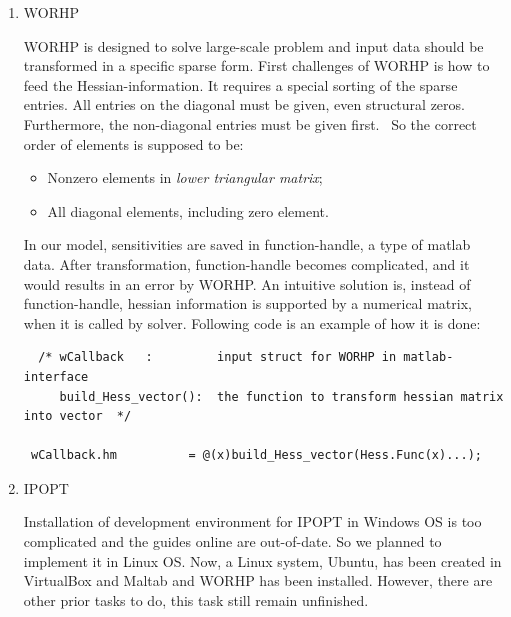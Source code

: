 \documentclass{article}
\begin{document}
\begin{enumerate}
\item WORHP

WORHP is designed to solve large-scale problem and input data should be transformed in a specific sparse form. First challenges of WORHP is how to feed the Hessian-information. It requires a special sorting of the sparse entries. All entries on the diagonal must be given, even structural zeros. Furthermore, the non-diagonal entries must be given first.~\cite{worhp} So the correct order of elements is supposed to be:
\begin{itemize}
  \item Nonzero elements in \textit{lower triangular matrix};
  \item All diagonal elements, including zero element.
\end{itemize}

In our model, sensitivities are saved in function-handle, a type of matlab data. After transformation, function-handle becomes complicated, and it would results in an error by WORHP. An intuitive solution is, instead of function-handle, hessian information is supported by a numerical matrix, when it is called by solver. Following code is an example of how it is done: 


\begin{verbatim}
  /* wCallback   :         input struct for WORHP in matlab-interface
     build_Hess_vector():  the function to transform hessian matrix into vector  */
     
 wCallback.hm          = @(x)build_Hess_vector(Hess.Func(x)...);
\end{verbatim}

\item IPOPT

Installation of development environment for IPOPT in Windows OS is too complicated and the guides online are out-of-date. So we planned to implement it in Linux OS. Now, a Linux system, Ubuntu, has been created in VirtualBox and Maltab and WORHP has been installed. However, there are other prior tasks to do, this task still remain unfinished. 

\end{enumerate}
\end{document}
